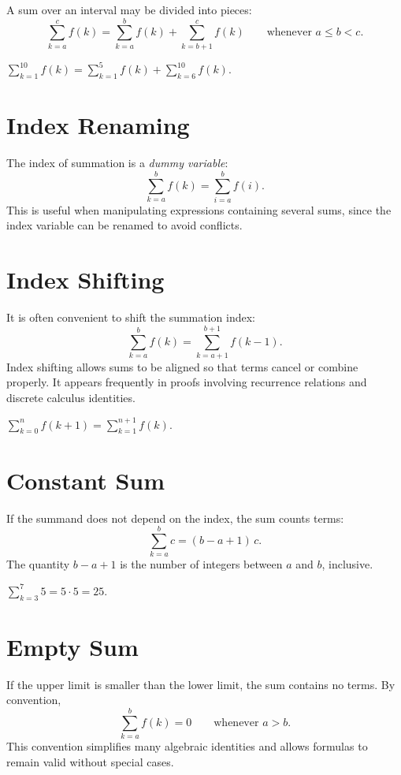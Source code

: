 A sum over an interval may be divided into pieces:
\[
\sum_{k=a}^{c} f(k)
=
\sum_{k=a}^{b} f(k)
+
\sum_{k=b+1}^{c} f(k)
\qquad \text{whenever } a \le b < c.
\]

\begin{example*}
\(\displaystyle\sum_{k=1}^{10} f(k)
= \sum_{k=1}^{5} f(k) + \sum_{k=6}^{10} f(k).\)
\end{example*}

\section*{Index Renaming}

The index of summation is a \emph{dummy variable}:
\[
\sum_{k=a}^{b} f(k)
=
\sum_{i=a}^{b} f(i).
\]
This is useful when manipulating expressions containing several sums,
since the index variable can be renamed to avoid conflicts.

\section*{Index Shifting}

It is often convenient to shift the summation index:
\[
\sum_{k=a}^{b} f(k)
=
\sum_{k=a+1}^{b+1} f(k-1).
\]
Index shifting allows sums to be aligned so that terms cancel or
combine properly. It appears frequently in proofs involving
recurrence relations and discrete calculus identities.

\begin{example*}
\(\displaystyle\sum_{k=0}^{n} f(k+1) = \sum_{k=1}^{n+1} f(k).\)
\end{example*}

\section*{Constant Sum}

If the summand does not depend on the index, the sum counts terms:
\[
\sum_{k=a}^{b} c = (b-a+1)\,c.
\]
The quantity \(b-a+1\) is the number of integers between \(a\) and \(b\),
inclusive.

\begin{example*}
\(\displaystyle\sum_{k=3}^{7} 5 = 5 \cdot 5 = 25.\)
\end{example*}

\section*{Empty Sum}

If the upper limit is smaller than the lower limit, the sum contains no
terms. By convention,
\[
\sum_{k=a}^{b} f(k) = 0 \qquad \text{whenever } a>b.
\]
This convention simplifies many algebraic identities and allows formulas
to remain valid without special cases.

